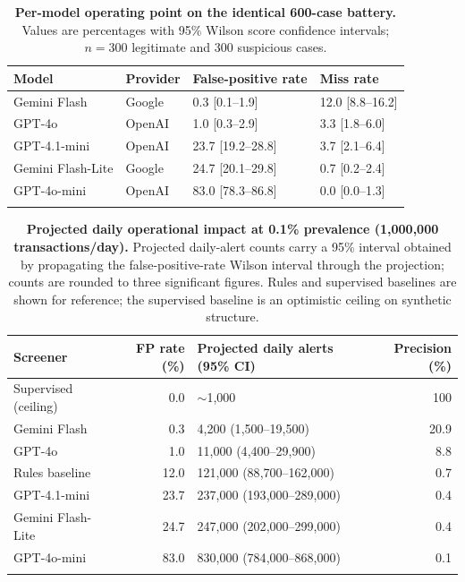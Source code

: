 \documentclass[lineno,pdflatex,sn-basic,Numbered]{sn-jnl}
\begin{document}
\begin{table}[t]
\caption{\textbf{Per-model operating point on the identical 600-case battery.} Values are percentages with 95\% Wilson score confidence intervals; $n=300$ legitimate and 300 suspicious cases.}\label{tab:ops}
\begin{tabular}{@{}llll@{}}
\toprule
Model & Provider & False-positive rate & Miss rate \\
\midrule
Gemini Flash      & Google & 0.3 [0.1--1.9]   & 12.0 [8.8--16.2] \\
GPT-4o            & OpenAI & 1.0 [0.3--2.9]   & 3.3 [1.8--6.0] \\
GPT-4.1-mini      & OpenAI & 23.7 [19.2--28.8]& 3.7 [2.1--6.4] \\
Gemini Flash-Lite & Google & 24.7 [20.1--29.8]& 0.7 [0.2--2.4] \\
GPT-4o-mini       & OpenAI & 83.0 [78.3--86.8]& 0.0 [0.0--1.3] \\
\botrule
\end{tabular}
\end{table}

\begin{table}[t]
\caption{\textbf{Projected daily operational impact at 0.1\% prevalence (1,000,000 transactions/day).} Projected daily-alert counts carry a 95\% interval obtained by propagating the false-positive-rate Wilson interval through the projection; counts are rounded to three significant figures. Rules and supervised baselines are shown for reference; the supervised baseline is an optimistic ceiling on synthetic structure.}\label{tab:vol}
\begin{tabular}{@{}lrlr@{}}
\toprule
Screener & FP rate (\%) & Projected daily alerts (95\% CI) & Precision (\%) \\
\midrule
Supervised (ceiling) & 0.0  & $\sim$1{,}000                    & 100 \\
Gemini Flash         & 0.3  & 4{,}200 (1{,}500--19{,}500)      & 20.9 \\
GPT-4o               & 1.0  & 11{,}000 (4{,}400--29{,}900)     & 8.8 \\
Rules baseline       & 12.0 & 121{,}000 (88{,}700--162{,}000)  & 0.7 \\
GPT-4.1-mini         & 23.7 & 237{,}000 (193{,}000--289{,}000) & 0.4 \\
Gemini Flash-Lite    & 24.7 & 247{,}000 (202{,}000--299{,}000) & 0.4 \\
GPT-4o-mini          & 83.0 & 830{,}000 (784{,}000--868{,}000) & 0.1 \\
\botrule
\end{tabular}
\end{table}
\end{document}
